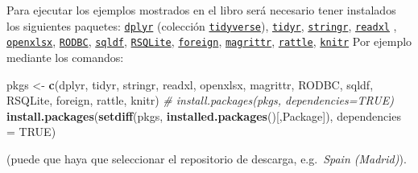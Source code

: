 \documentclass[
]{book}
\newenvironment{Shaded}{\begin{snugshade}}{\end{snugshade}}
\newcommand{\AttributeTok}[1]{\textcolor[rgb]{0.13,0.29,0.53}{#1}}
\newcommand{\CommentTok}[1]{\textcolor[rgb]{0.56,0.35,0.01}{\textit{#1}}}
\newcommand{\ConstantTok}[1]{\textcolor[rgb]{0.56,0.35,0.01}{#1}}
\newcommand{\FunctionTok}[1]{\textcolor[rgb]{0.13,0.29,0.53}{\textbf{#1}}}
\newcommand{\NormalTok}[1]{#1}
\newcommand{\OtherTok}[1]{\textcolor[rgb]{0.56,0.35,0.01}{#1}}
\newcommand{\StringTok}[1]{\textcolor[rgb]{0.31,0.60,0.02}{#1}}
\begin{document}
Para ejecutar los ejemplos mostrados en el libro será necesario tener instalados los siguientes paquetes:
\href{https://dplyr.tidyverse.org}{\texttt{dplyr}} (colección \href{https://www.tidyverse.org/}{\texttt{tidyverse}}),
\href{https://tidyr.tidyverse.org}{\texttt{tidyr}},
\href{https://stringr.tidyverse.org}{\texttt{stringr}},
\href{https://readxl.tidyverse.org}{\texttt{readxl}} ,
\href{https://cran.r-project.org/web/packages/openxlsx/index.html}{\texttt{openxlsx}}, \href{https://cran.r-project.org/web/packages/RODBC/index.html}{\texttt{RODBC}},
\href{https://cran.r-project.org/web/packages/sqldf/index.html}{\texttt{sqldf}},
\href{https://r-dbi.github.io/RSQLite}{\texttt{RSQLite}},
\href{https://cran.r-project.org/web/packages/foreign/index.html}{\texttt{foreign}},
\href{https://cran.r-project.org/web/packages/magrittr/index.html}{\texttt{magrittr}},
\href{https://rattle.togaware.com}{\texttt{rattle}},
\href{https://yihui.name/knitr}{\texttt{knitr}}
Por ejemplo mediante los comandos:

\begin{Shaded}
\begin{Highlighting}[]
\NormalTok{pkgs }\OtherTok{\textless{}{-}} \FunctionTok{c}\NormalTok{(}\StringTok{\textquotesingle{}dplyr\textquotesingle{}}\NormalTok{, }\StringTok{\textquotesingle{}tidyr\textquotesingle{}}\NormalTok{, }\StringTok{\textquotesingle{}stringr\textquotesingle{}}\NormalTok{, }\StringTok{\textquotesingle{}readxl\textquotesingle{}}\NormalTok{, }\StringTok{\textquotesingle{}openxlsx\textquotesingle{}}\NormalTok{, }\StringTok{\textquotesingle{}magrittr\textquotesingle{}}\NormalTok{, }
          \StringTok{\textquotesingle{}RODBC\textquotesingle{}}\NormalTok{, }\StringTok{\textquotesingle{}sqldf\textquotesingle{}}\NormalTok{, }\StringTok{\textquotesingle{}RSQLite\textquotesingle{}}\NormalTok{, }\StringTok{\textquotesingle{}foreign\textquotesingle{}}\NormalTok{, }\StringTok{\textquotesingle{}rattle\textquotesingle{}}\NormalTok{, }\StringTok{\textquotesingle{}knitr\textquotesingle{}}\NormalTok{)}
\CommentTok{\# install.packages(pkgs, dependencies=TRUE)}
\FunctionTok{install.packages}\NormalTok{(}\FunctionTok{setdiff}\NormalTok{(pkgs, }\FunctionTok{installed.packages}\NormalTok{()[,}\StringTok{\textquotesingle{}Package\textquotesingle{}}\NormalTok{]), }\AttributeTok{dependencies =} \ConstantTok{TRUE}\NormalTok{)}
\end{Highlighting}
\end{Shaded}

(puede que haya que seleccionar el repositorio de descarga, e.g.~\emph{Spain (Madrid)}).
\end{document}

